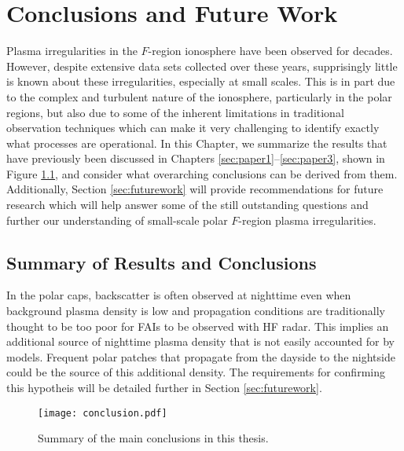 
\chapter{Conclusions and Future Work}
\label{sec:conclusion}

Plasma irregularities in the \(F\)-region ionosphere have been observed for decades.  However, despite extensive data sets collected over these years, supprisingly little is known about these irregularities, especially at small scales.  This is in part due to the complex and turbulent nature of the ionosphere, particularly in the polar regions, but also due to some of the inherent limitations in traditional observation techniques which can make it very challenging to identify exactly what processes are operational.  In this Chapter, we summarize the results that have previously been discussed in Chapters \ref{sec:paper1}--\ref{sec:paper3}, shown in Figure \ref{fig:conclusion}, and consider what overarching conclusions can be derived from them.  Additionally, Section \ref{sec:futurework} will provide recommendations for future research which will help answer some of the still outstanding questions and further our understanding of small-scale polar \(F\)-region plasma irregularities.

\section{Summary of Results and Conclusions}
\label{sec:summary}

In the polar caps, backscatter is often observed at nighttime even when background plasma density is low and propagation conditions are traditionally thought to be too poor for FAIs to be observed with HF radar.  This implies an additional source of nighttime plasma density that is not easily accounted for by models.  Frequent polar patches that propagate from the dayside to the nightside could be the source of this additional density.  The requirements for confirming this hypotheis will be detailed further in Section \ref{sec:futurework}.

\begin{figure}
  \texttt{[image: conclusion.pdf]}
  \caption{Summary of the main conclusions in this thesis.}
  \label{fig:conclusion}
\end{figure}

